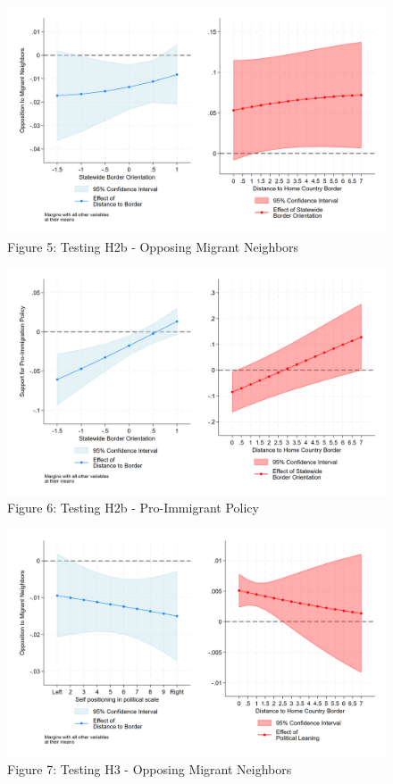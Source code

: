 \documentclass[12pt,]{article}
\begin{document}
\begin{figure}
\centering
\includegraphics{figures/m4a_marginal_1.png}
\caption{Figure 5: Testing H2b - Opposing Migrant Neighbors}
\end{figure}

\begin{figure}
\centering
\includegraphics{figures/m4a_policy_marginal_1.png}
\caption{Figure 6: Testing H2b - Pro-Immigrant Policy}
\end{figure}

\begin{figure}
\centering
\includegraphics{figures/m5_marginal_1.png}
\caption{Figure 7: Testing H3 - Opposing Migrant Neighbors}
\end{figure}
\end{document}
